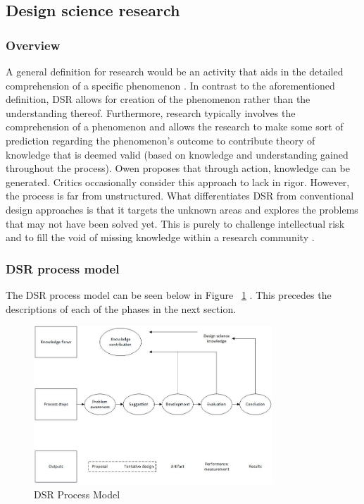 \subsection{Design science research}
\subsubsection{Overview} 
A general definition for research would be an activity that aids in the detailed comprehension of a specific phenomenon \cite{Vaishnavi2015}. In contrast to the aforementioned definition, DSR allows for creation of the phenomenon rather than the understanding thereof. Furthermore, research typically involves the comprehension of a phenomenon and allows the research to make some sort of prediction regarding the phenomenon’s outcome to contribute theory of knowledge that is deemed valid (based on knowledge and understanding gained throughout the process). Owen \cite{owen1998design} proposes that through action, knowledge can be generated. Critics occasionally consider this approach to lack in rigor. However, the process is far from unstructured.
What differentiates DSR from conventional design approaches is that it targets the unknown areas and explores the problems that may not have been solved yet. This is purely to challenge intellectual risk and to fill the void of missing knowledge within a research community \cite{Vaishnavi2015}.
\subsubsection{DSR process model}
The DSR process model can be seen below in Figure ~\ref{fig:DSR_Process_Model} \cite{Vaishnavi2015}. This precedes the descriptions of each of the phases in the next section.
\begin{figure}[ht]
\centering
\includegraphics[width=0.8\textwidth]{Chapter1/Figs/Figure2.jpg}
\caption{DSR Process Model}
\label{fig:DSR_Process_Model}
\end{figure}

